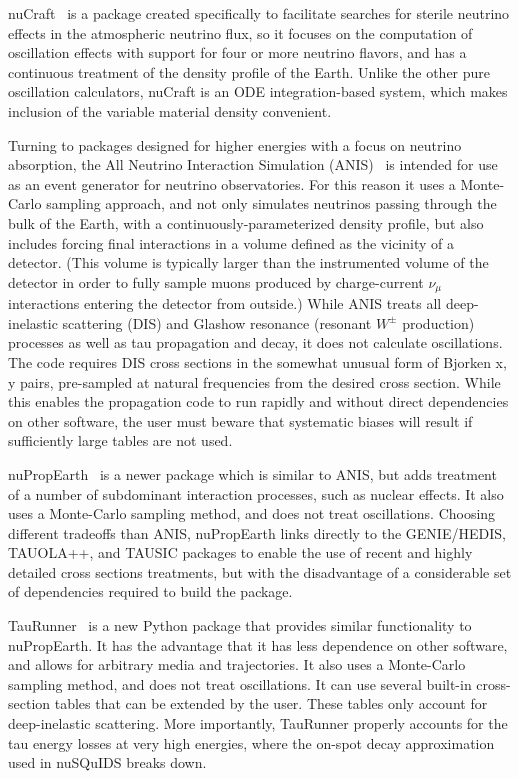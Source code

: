\documentclass[3p,12pt]{elsarticle}
\newcommand{\ttf}{\ttfamily}
\begin{document}
nuCraft~\cite{Wallraff:2014vl} is a package created specifically to facilitate searches for sterile neutrino effects in the atmospheric neutrino flux, so it focuses on the computation of oscillation effects with support for four or more neutrino flavors, and has a continuous treatment of the density profile of the Earth. 
Unlike the other pure oscillation calculators, nuCraft is an ODE integration-based system, which makes inclusion of the variable material density convenient. 

Turning to packages designed for higher energies with a focus on neutrino absorption, the All Neutrino Interaction Simulation (ANIS)~\cite{ANIS} is intended for use as an event generator for neutrino observatories. 
For this reason it uses a Monte-Carlo sampling approach, and not only simulates neutrinos passing through the bulk of the Earth, with a continuously-parameterized density profile, but also includes forcing final interactions in a volume defined as the vicinity of a detector. (This volume is typically larger than the instrumented volume of the detector in order to fully sample muons produced by charge-current $\nu_\mu$ interactions entering the detector from outside.)
While ANIS treats all deep-inelastic scattering (DIS) and Glashow resonance (resonant $W^\pm$ production) processes as well as tau propagation and decay, it does not calculate oscillations. 
The code requires DIS cross sections in the somewhat unusual form of Bjorken x, y pairs, pre-sampled at natural frequencies from the desired cross section. 
While this enables the propagation code to run rapidly and without direct dependencies on other software, the user must beware that systematic biases will result if sufficiently large tables are not used. 

nuPropEarth~\cite{nuPropEarth2020} is a newer package which is similar to ANIS, but adds treatment of a number of subdominant interaction processes, such as nuclear effects. 
It also uses a Monte-Carlo sampling method, and does not treat oscillations.
Choosing different tradeoffs than ANIS, nuPropEarth links directly to the GENIE/HEDIS, TAUOLA++, and TAUSIC packages to enable the use of recent and highly detailed cross sections treatments, but with the disadvantage of a considerable set of dependencies required to build the package.

TauRunner~\cite{Safa:2021ghs} is a new {\ttf Python} package that provides similar functionality to nuPropEarth.
It has the advantage that it has less dependence on other software, and allows for arbitrary media and trajectories.
It also uses a Monte-Carlo sampling method, and does not treat oscillations.
It can use several built-in cross-section tables that can be extended by the user.
These tables only account for deep-inelastic scattering.
More importantly, TauRunner properly accounts for the tau energy losses at very high energies, where the on-spot decay approximation used in {\ttf nuSQuIDS} breaks down.
\end{document}
